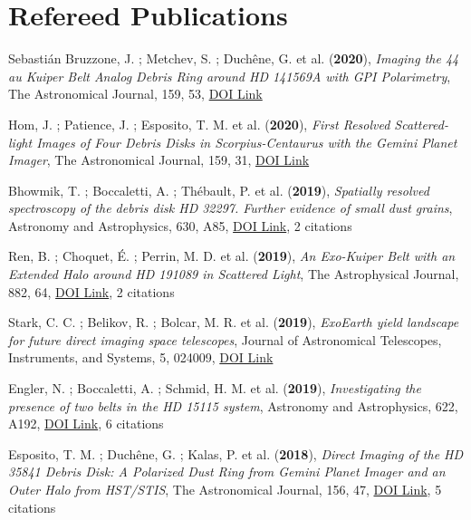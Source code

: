 \documentclass[11pt]{article}
\begin{document}
\section*{Refereed Publications}

\begin{etaremune}\itemsep 0pt


\item Sebasti{\'a}n Bruzzone, J. ; Metchev, S. ; Duch{\^e}ne, G. et al. ({\bf2020}), {\it Imaging the 44 au Kuiper Belt Analog Debris Ring around HD 141569A with GPI Polarimetry}, The Astronomical Journal, 159, 53, \href{https://doi.org/10.3847/1538-3881/ab5d2e}{DOI Link}

\item Hom, J. ; Patience, J. ; Esposito, T. M. et al. ({\bf2020}), {\it First Resolved Scattered-light Images of Four Debris Disks in Scorpius-Centaurus with the Gemini Planet Imager}, The Astronomical Journal, 159, 31, \href{https://doi.org/10.3847/1538-3881/ab5af2}{DOI Link}

\item Bhowmik, T. ; Boccaletti, A. ; Th{\'e}bault, P. et al. ({\bf2019}), {\it Spatially resolved spectroscopy of the debris disk HD 32297. Further evidence of small dust grains}, Astronomy and Astrophysics, 630, A85, \href{https://doi.org/10.1051/0004-6361/201936076}{DOI Link}, 2 citations

\item Ren, B. ; Choquet, {\'E}. ; Perrin, M. D. et al. ({\bf2019}), {\it An Exo-Kuiper Belt with an Extended Halo around HD 191089 in Scattered Light}, The Astrophysical Journal, 882, 64, \href{https://doi.org/10.3847/1538-4357/ab3403}{DOI Link}, 2 citations

\item Stark, C. C. ; Belikov, R. ; Bolcar, M. R. et al. ({\bf2019}), {\it ExoEarth yield landscape for future direct imaging space telescopes}, Journal of Astronomical Telescopes, Instruments, and Systems, 5, 024009, \href{https://doi.org/10.1117/1.JATIS.5.2.024009}{DOI Link}

\item Engler, N. ; Boccaletti, A. ; Schmid, H. M. et al. ({\bf2019}), {\it Investigating the presence of two belts in the HD 15115 system}, Astronomy and Astrophysics, 622, A192, \href{https://doi.org/10.1051/0004-6361/201833542}{DOI Link}, 6 citations

\item Esposito, T. M. ; Duch{\^e}ne, G. ; Kalas, P. et al. ({\bf2018}), {\it Direct Imaging of the HD 35841 Debris Disk: A Polarized Dust Ring from Gemini Planet Imager and an Outer Halo from HST/STIS}, The Astronomical Journal, 156, 47, \href{https://doi.org/10.3847/1538-3881/aacbc9}{DOI Link}, 5 citations


\end{etaremune}
\end{document}
